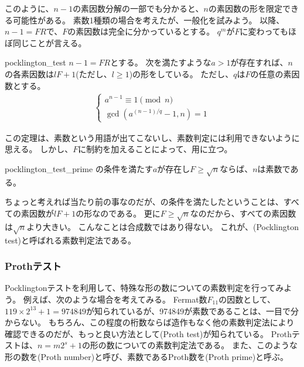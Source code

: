 このように、$n-1$の素因数分解の一部でも分かると、$n$の素因数の形を限定できる可能性がある。
素数1種類の場合を考えたが、一般化を試みよう。
以降、$n-1=FR$で、$F$の素因数は完全に分かっているとする。
$q^m$が$F$に変わってもほぼ同じことが言える。

\begin{Theo}{}{pocklington_test}
$n-1=FR$とする。
次を満たすような$a>1$が存在すれば、$n$の各素因数は$lF+1$(ただし、$l\ge1$)の形をしている。
ただし、$q$は$F$の任意の素因数とする。
\begin{align*}
\begin{cases}
a^{n-1} \equiv 1 \pmod{n}\\
\gcd(a^{(n-1)/q}-1, n) = 1
\end{cases}
\end{align*}
\end{Theo}

この定理は、素数という用語が出てこないし、素数判定には利用できないように思える。
しかし、$F$に制約を加えることによって、用に立つ。

\begin{Coro}{}{pocklington_test_prime}
の条件を満たす$a$が存在し$F\ge\sqrt{n}$ならば、$n$は素数である。
\end{Coro}

ちょっと考えれば当たり前の事なのだが、の条件を満たしたということは、すべての素因数が$lF+1$の形なのである。
更に$F\ge\sqrt{n}$なのだから、すべての素因数は$\sqrt{n}$より大きい。
こんなことは合成数ではあり得ない。
これが、(Pocklington test)と呼ばれる素数判定法である。


\subsubsection{Prothテスト}
Pocklingtonテストを利用して、特殊な形の数についての素数判定を行ってみよう。
例えば、次のような場合を考えてみる。
Fermat数$F_{11}$の因数として、$119\times2^{13}+1=974849$が知られているが、974849が素数であることは、一目で分からない。
もちろん、この程度の桁数ならば造作もなく他の素数判定法により確認できるのだが、もっと良い方法として(Proth test)が知られている。
Prothテストは、$n = m2^s+1$の形の数についての素数判定法である。
また、このような形の数を(Proth number)と呼び、素数であるProth数を(Proth prime)と呼ぶ。

